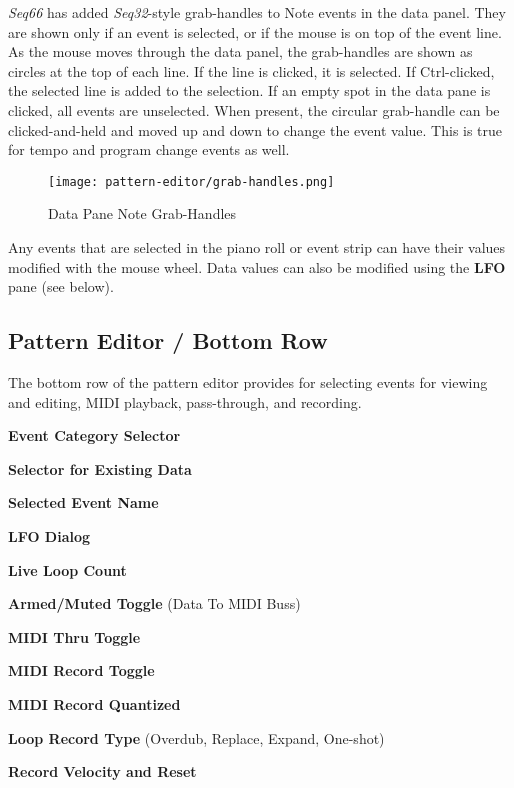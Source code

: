    \textsl{Seq66} has added \textsl{Seq32}-style grab-handles
   to Note events in the data panel.
   They are shown only if an event is selected, or if the mouse
   is on top of the event line.
   As the mouse moves through the data panel, the grab-handles are shown
   as circles at the top of each line.
   If the line is clicked, it is selected.
   If Ctrl-clicked, the selected line is added to the selection.
   If an empty spot in the data pane is clicked, all events are
   unselected.
   When present, the circular grab-handle can be clicked-and-held
   and moved up and down to change the event value.
   This is true for tempo and program change events as well.

\begin{figure}[H]
   \centering 
   \texttt{[image: pattern-editor/grab-handles.png]}
   \caption{Data Pane Note Grab-Handles}
   \label{fig:pattern_editor_data_pane_note_grab_handles}
\end{figure}

   Any events that are selected in the piano roll or event strip can have
   their values modified with the mouse wheel.
   Data values can also be modified using the \textbf{LFO} pane (see below).

\subsection{Pattern Editor / Bottom Row}
\label{subsec:pattern_editor_bottom}

   The bottom row of the pattern editor provides for
   selecting events for viewing and editing, MIDI playback,
   pass-through, and recording.

   \begin{enumber}
      \item \textbf{Event Category Selector}
      \item \textbf{Selector for Existing Data}
      \item \textbf{Selected Event Name}
      \item \textbf{LFO Dialog}
      \item \textbf{Live Loop Count}
      \item \textbf{Armed/Muted Toggle} (Data To MIDI Buss)
      \item \textbf{MIDI Thru Toggle}
      \item \textbf{MIDI Record Toggle}
      \item \textbf{MIDI Record Quantized}
      \item \textbf{Loop Record Type} (Overdub, Replace, Expand, One-shot)
      \item \textbf{Record Velocity and Reset}
   \end{enumber}

